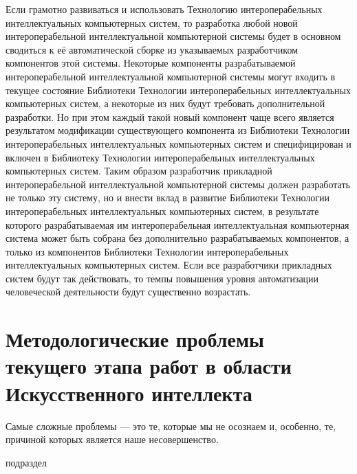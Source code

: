 \begin{textitemize}
	Если грамотно развиваться и использовать Технологию интероперабельных интеллектуальных компьютерных систем, то разработка любой новой интероперабельной интеллектуальной компьютерной системы будет в основном сводиться к её автоматической сборке из указываемых разработчиком компонентов этой системы. Некоторые компоненты разрабатываемой интероперабельной интеллектуальной компьютерной системы могут входить в текущее состояние Библиотеки Технологии интероперабельных интеллектуальных компьютерных систем, а некоторые из них будут требовать дополнительной разработки. Но при этом каждый такой новый компонент чаще всего является результатом модификации существующего компонента из Библиотеки Технологии интероперабельных интеллектуальных компьютерных систем и  специфицирован и включен в Библиотеку Технологии интероперабельных интеллектуальных компьютерных систем. Таким образом разработчик прикладной интероперабельной интеллектуальной компьютерной системы должен разработать не только эту систему, но и внести вклад в развитие Библиотеки Технологии интероперабельных интеллектуальных компьютерных систем, в результате которого разрабатываемая им интероперабельная интеллектуальная компьютерная система может быть собрана без дополнительно разрабатываемых компонентов, а только из компонентов Библиотеки Технологии интероперабельных интеллектуальных компьютерных систем. Если все разработчики прикладных систем будут так действовать, то темпы повышения уровня автоматизации человеческой деятельности будут существенно возрастать.
\end{textitemize}

\section*{Методологические проблемы текущего этапа работ в области Искусственного интеллекта}
\label{concl_methodological_problems_current_stage_work_field_AI}

\begin{SCn}
	{Самые сложные проблемы --- это те, которые мы не осознаем и, особенно, те, причиной которых является наше несовершенство.
	}
	
	\begin{scnrelfromlist}{подраздел}
	\end{scnrelfromlist}
\end{SCn}

